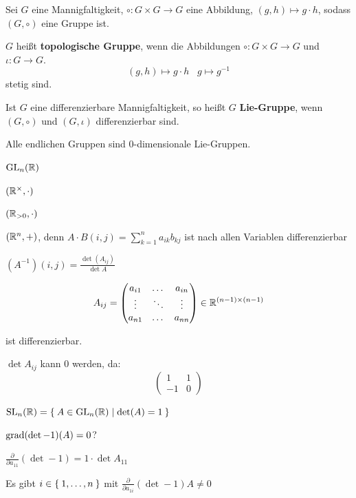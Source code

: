\begin{definition}%
    Sei $G$ eine Mannigfaltigkeit, $\circ: G \times G \rightarrow G$
    eine Abbildung, $(g,h) \mapsto g \cdot h$, sodass $(G, \circ)$
    eine Gruppe ist.

    \begin{defenum}
        \item $G$ heißt \textbf{topologische Gruppe},
              wenn die Abbildungen $\circ: G \times G \rightarrow G$
              und $\iota: G \rightarrow G$.
              \[(g, h) \mapsto g \cdot h\;\;\; g \mapsto g^{-1}\]
              stetig sind.
        \item Ist $G$ eine differenzierbare Mannigfaltigkeit, so heißt
              $G$ \textbf{Lie-Gruppe}, wenn
              $(G, \circ)$ und $(G, \iota)$ differenzierbar sind.
    \end{defenum}
\end{definition}

\begin{beispiel}
    \begin{bspenum}
        \item Alle endlichen Gruppen sind 0-dimensionale Lie-Gruppen.
        \item $\mathrm{GL}_n(\mathbb{R})$
        \item $(\mathbb{R}^\times, \cdot)$
        \item $(\mathbb{R}_{>0}, \cdot)$
        \item $(\mathbb{R}^n, +)$, denn $A \cdot B (i,j) = \sum_{k=1}^n a_{ik} b_{kj}$ ist
              nach allen Variablen differenzierbar

              $(A^{-1}) (i,j) = \frac{\det(A_{ij})}{\det A}$

              \[A_{ij} = \begin{pmatrix}
                a_{i1} & \dots  & a_{in}\\
                \vdots & \ddots & \vdots\\
                a_{n1} & \dots  & a_{nn}
              \end{pmatrix} \in \mathbb{R}^{(n-1) \times (n-1)}\]

            ist differenzierbar.

            $\det A_{ij}$ kann $0$ werden, da:
            \[\begin{pmatrix}1 & 1\\-1&0\end{pmatrix}\]
        \item $\mathrm{SL}_n(\mathbb{R}) = \Set{A \in \ensuremath{\mathrm{GL}}_n(\ensuremath{\mathbb{R}}) | \det(A) = 1} $ 

              $\operatorname{grad}(\det-1)(A) = 0$?

              $\frac{\partial}{\partial a_{11}} (\det -1) = 1 \cdot \det A_{11}$

              Es gibt $i \in \Set{1, \dots, n}$ mit $\frac{\partial}{\partial a_{1i}} (\det -1) A \neq 0$
    \end{bspenum}
\end{beispiel}

